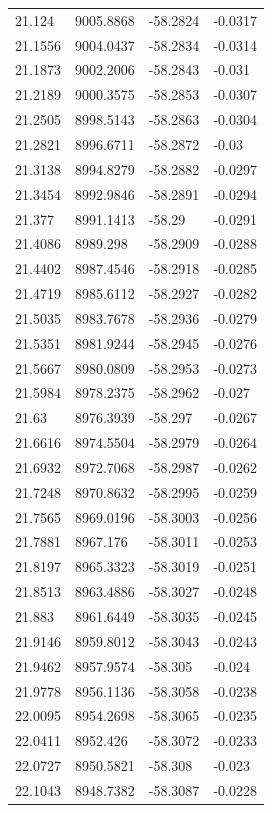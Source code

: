 \begin{table}[H]
\begin{tabular}{llll}
21.124 & 9005.8868 & -58.2824 & -0.0317 \\
21.1556 & 9004.0437 & -58.2834 & -0.0314 \\
21.1873 & 9002.2006 & -58.2843 & -0.031 \\
21.2189 & 9000.3575 & -58.2853 & -0.0307 \\
21.2505 & 8998.5143 & -58.2863 & -0.0304 \\
21.2821 & 8996.6711 & -58.2872 & -0.03 \\
21.3138 & 8994.8279 & -58.2882 & -0.0297 \\
21.3454 & 8992.9846 & -58.2891 & -0.0294 \\
21.377 & 8991.1413 & -58.29 & -0.0291 \\
21.4086 & 8989.298 & -58.2909 & -0.0288 \\
21.4402 & 8987.4546 & -58.2918 & -0.0285 \\
21.4719 & 8985.6112 & -58.2927 & -0.0282 \\
21.5035 & 8983.7678 & -58.2936 & -0.0279 \\
21.5351 & 8981.9244 & -58.2945 & -0.0276 \\
21.5667 & 8980.0809 & -58.2953 & -0.0273 \\
21.5984 & 8978.2375 & -58.2962 & -0.027 \\
21.63 & 8976.3939 & -58.297 & -0.0267 \\
21.6616 & 8974.5504 & -58.2979 & -0.0264 \\
21.6932 & 8972.7068 & -58.2987 & -0.0262 \\
21.7248 & 8970.8632 & -58.2995 & -0.0259 \\
21.7565 & 8969.0196 & -58.3003 & -0.0256 \\
21.7881 & 8967.176 & -58.3011 & -0.0253 \\
21.8197 & 8965.3323 & -58.3019 & -0.0251 \\
21.8513 & 8963.4886 & -58.3027 & -0.0248 \\
21.883 & 8961.6449 & -58.3035 & -0.0245 \\
21.9146 & 8959.8012 & -58.3043 & -0.0243 \\
21.9462 & 8957.9574 & -58.305 & -0.024 \\
21.9778 & 8956.1136 & -58.3058 & -0.0238 \\
22.0095 & 8954.2698 & -58.3065 & -0.0235 \\
22.0411 & 8952.426 & -58.3072 & -0.0233 \\
22.0727 & 8950.5821 & -58.308 & -0.023 \\
22.1043 & 8948.7382 & -58.3087 & -0.0228 \\

\end{tabular}
\end{table}
